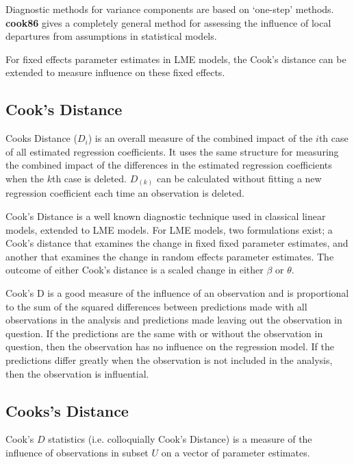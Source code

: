 \documentclass[12pt, a4paper]{article}
\begin{document}
\bigskip 


Diagnostic methods for variance components are based on `one-step' methods. \textbf{cook86} gives a completely general method for assessing the influence of local departures from assumptions in statistical models.

For fixed effects parameter estimates in LME models, the  Cook's distance can be extended to measure influence on these fixed effects.

\subsection{Cook's Distance}%

Cooks Distance ($D_{i}$) is an overall measure of the combined impact of the $i$th case of all estimated regression coefficients. It uses the same structure for measuring the combined impact of the differences in the estimated regression coefficients when the $k$th case is deleted. $D_{(k)}$ can be calculated without fitting
a new regression coefficient each time an observation is deleted.

\bigskip

Cook's Distance is a well known diagnostic technique used in classical linear models, extended to LME models.  For LME models, two formulations exist; a Cook's distance that examines the change in fixed fixed parameter estimates, and another that examines the change in random effects parameter estimates. The outcome of either Cook's distance is a scaled change in either $\beta$ or $\theta$.



Cook's D is a good measure of the influence of an observation and is proportional to the sum of the squared differences between predictions made with all observations in the analysis and predictions made leaving out the observation in question. If the predictions are the same with or without the observation in question, then the observation has no influence on the regression model. If the predictions differ greatly when the observation is not included in the analysis, then the observation is influential.


\subsection{Cooks's Distance}%
 Cook's $D$ statistics (i.e. colloquially Cook's Distance) is a measure of the influence of observations in subset $U$ on a vector of parameter estimates.
\end{document}
